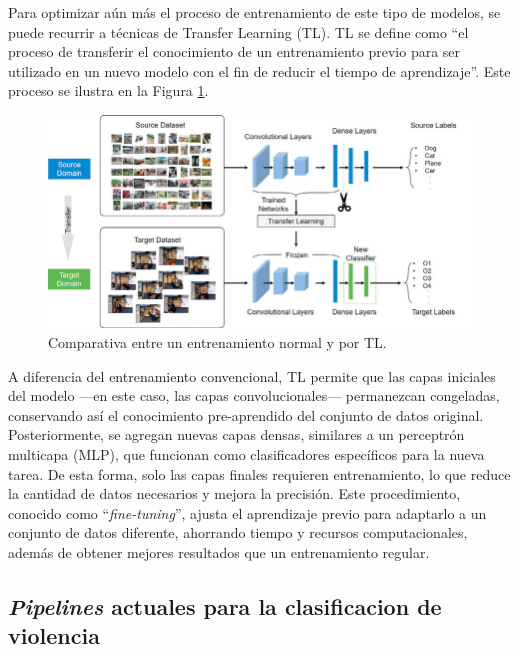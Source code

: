 Para optimizar aún más el proceso de entrenamiento de este tipo 
de modelos, se puede recurrir a técnicas de Transfer Learning (TL). 
TL se define como 
``el proceso de transferir el conocimiento de un entrenamiento 
previo para ser utilizado en un nuevo modelo con el fin de 
reducir el tiempo de aprendizaje''\cite{Yani2019}. Este proceso 
se ilustra en la Figura \ref{transfer-learning}.

\begin{figure}[h!]
    \includegraphics[width=1\textwidth]{images/transfer-learning.png}
    \centering
    \caption[Comparativa entre un entrenamiento normal y por TL.]
    {Comparativa entre un entrenamiento normal y por TL\protect \cite{transfer-learning}.}
    \label{transfer-learning}
\end{figure}

A diferencia del entrenamiento convencional, TL permite que las 
capas iniciales del modelo —en este caso, las capas 
convolucionales— permanezcan congeladas, conservando así el 
conocimiento pre-aprendido del conjunto de datos original. 
Posteriormente, se agregan nuevas capas densas, similares a 
un perceptrón multicapa (MLP), que funcionan como clasificadores 
específicos para la nueva tarea. De esta forma, solo las capas 
finales requieren entrenamiento, lo que reduce la cantidad de 
datos necesarios y mejora la precisión. Este procedimiento, 
conocido como ``\textit{fine-tuning}'', ajusta el aprendizaje 
previo para adaptarlo a un conjunto de datos diferente, 
ahorrando tiempo y recursos computacionales, además de obtener 
mejores resultados que un entrenamiento regular.

\subsection{\textit{Pipelines} actuales para la clasificacion de violencia}

